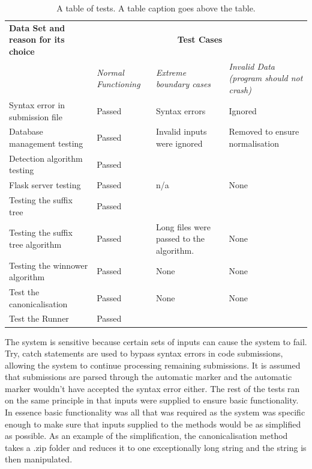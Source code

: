 \documentclass[11pt,a4paper]{article}
\begin{document}
\begin{table}[H]
  \centering
\caption{A table of tests. A table caption goes above the table.}

  \begin{tabular}[t]{|p{5cm}|p{3cm}|p{3cm}|p{3cm}|} 
      \hline 
          \textbf{Data Set and reason for its choice} & 
          \multicolumn{3}{c|}{\textbf{Test Cases}}
          \\
          \cline{2-4} & 
            \emph{Normal Functioning} & 
            \emph{Extreme boundary cases} &
            \emph{Invalid Data (program should not crash)} 
          \\ 
          \hline 
            Syntax error in submission file & 
            Passed & 
            Syntax errors & 
            Ignored
          \\
          \hline 
            Database management testing &
            Passed &
            Invalid inputs were ignored &
            Removed to ensure normalisation
          \\ 
          \hline
            Detection algorithm testing &
            Passed &
            &
          \\ 
          \hline
            Flask server testing &
            Passed &
            n/a &
            None
          \\
          \hline
              Testing the suffix tree &
              Passed &
              &
          \\
          \hline
            Testing the suffix tree algorithm &
            Passed &
            Long files were passed to the algorithm. &
            None
          \\
          \hline
            Testing the winnower algorithm &
            Passed &
            None &
            None
          \\
          \hline
            Test the canonicalisation &
            Passed &
            None &
            None
          \\
          \hline
          Test the Runner &
          Passed &
          &
          \\
          \hline
  \end{tabular}

\label{tab:tests}
\end{table}

The system is sensitive because certain sets of inputs can cause the
system to fail. Try, catch statements are used to bypass syntax errors in code
submissions, allowing the system to continue processing remaining submissions.
It is assumed that submissions are parsed through the automatic marker and the automatic marker wouldn't have accepted the syntax error either. The rest of the tests ran on the same principle in that inputs were supplied to ensure basic functionality. In essence basic functionality was all that was required as the system was specific enough to make sure that inputs supplied to the methods would be as simplified as possible. As an example of the simplification, the canonicalisation method takes a .zip folder and reduces it to one exceptionally long string and the string is then manipulated.
\end{document}
